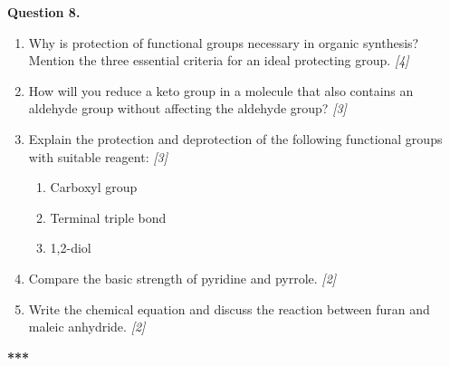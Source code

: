 \documentclass[11pt,a4paper]{article}
\newcommand{\pts}[1]{\hfill \textit{[#1]}}
\begin{document}
\bigskip

\noindent \textbf{Question 8.}
\begin{enumerate}[label=(\alph*)]
  \item Why is protection of functional groups necessary in organic synthesis? Mention the three essential criteria for an ideal protecting group. \pts{4}
  \item How will you reduce a keto group in a molecule that also contains an aldehyde group without affecting the aldehyde group? \pts{3}
  \item Explain the protection and deprotection of the following functional groups with suitable reagent: \pts{3}
  \begin{enumerate}[label=(\roman*)]
    \item Carboxyl group
    \item Terminal triple bond
    \item 1,2-diol
  \end{enumerate}
  \item Compare the basic strength of pyridine and pyrrole. \pts{2}
  \item Write the chemical equation and discuss the reaction between furan and maleic anhydride. \pts{2}
\end{enumerate}

\bigskip
\begin{center}
  \textbf{***}
\end{center}
\end{document}
